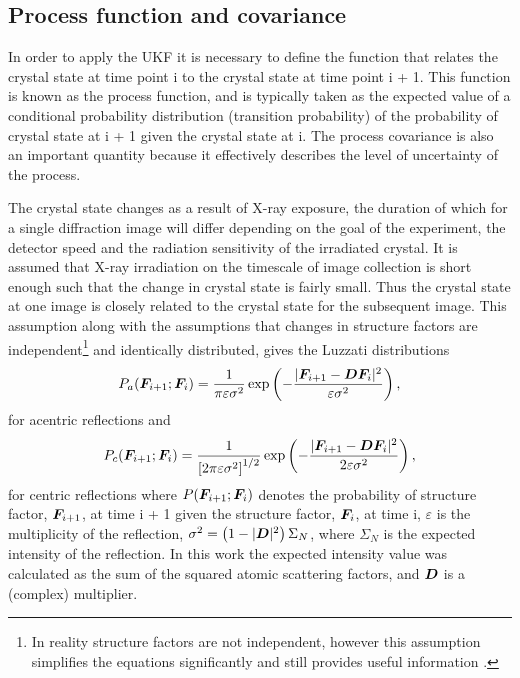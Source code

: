 \subsection{Process function and covariance}
\label{sub:Process Function and covariance}
In order to apply the UKF it is necessary to define the function that relates the crystal state at time point i to the crystal state at time point i + 1.
This function is known as the process function, and is typically taken as the expected value of a conditional probability distribution (transition probability) of the probability of crystal state at i + 1 given the crystal state at i.
The process covariance is also an important quantity because it effectively describes the level of uncertainty of the process.

The crystal state changes as a result of X-ray exposure, the duration of which for a single diffraction image will differ depending on the goal of the experiment, the detector speed and the radiation sensitivity of the irradiated crystal.
It is assumed that X-ray irradiation on the timescale of image collection is short enough such that the change in crystal state is fairly small.
Thus the crystal state at one image is closely related to the crystal state for the subsequent image.
This assumption along with the assumptions that changes in structure factors are independent\footnote{In reality structure factors are not independent, however this assumption simplifies the equations significantly and still provides useful information \cite{pannu1996improved}.} and identically distributed, gives the Luzzati distributions \cite{luzzati1952traitement,read1990structure,pannu1996improved}
\begin{equation}
    P_a(\boldsymbol{F}_{i+1} ; \boldsymbol{F}_i) = \frac{1}{\pi \varepsilon \sigma^2} \exp \left(-\frac{|\boldsymbol{F}_{i+1} - \boldsymbol{D}\boldsymbol{F}_i|^2}{\varepsilon \sigma^2}\right),
    \label{eq:Luzzati distribution for acentric reflections}
\end{equation}
for acentric reflections and
\begin{equation}
    P_c(\boldsymbol{F}_{i+1} ; \boldsymbol{F}_i) = \frac{1}{\left[ 2 \pi \varepsilon \sigma^2 \right]^{1/2}} \exp \left(-\frac{|\boldsymbol{F}_{i+1} - \boldsymbol{D}\boldsymbol{F}_i|^2}{2 \varepsilon \sigma^2}\right),
    \label{eq:Luzzati distribution for centric reflections}
\end{equation}
for centric reflections where $P(\boldsymbol{F}_{i+1} ; \boldsymbol{F}_i)$ denotes the probability of structure factor, $\boldsymbol{F}_{i+1}$, at time i + 1 given the structure factor, $\boldsymbol{F}_{i}$, at time i, $\varepsilon$ is the multiplicity of the reflection, $\sigma^2 = \left(1 - |\boldsymbol{D}|^2 \right)\Sigma_N$, where $\Sigma_N$ is the expected intensity of the reflection.
In this work the expected intensity value was calculated as the sum of the squared atomic scattering factors, and $\boldsymbol{D}$ is a (complex) multiplier.

